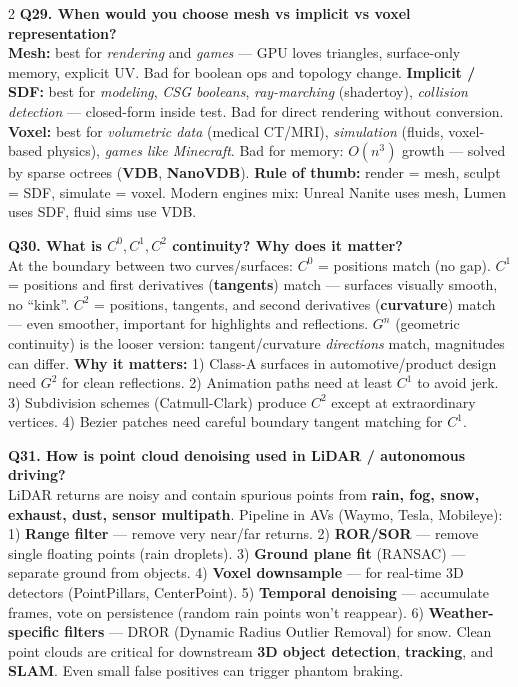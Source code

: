 \begin{paracol}{2}
\textbf{Q29. When would you choose mesh vs implicit vs voxel representation?}\\
\textbf{Mesh:} best for \textit{rendering} and \textit{games} — GPU loves triangles, surface-only memory, explicit UV. Bad for boolean ops and topology change. \textbf{Implicit / SDF:} best for \textit{modeling}, \textit{CSG booleans}, \textit{ray-marching} (shadertoy), \textit{collision detection} — closed-form inside test. Bad for direct rendering without conversion. \textbf{Voxel:} best for \textit{volumetric data} (medical CT/MRI), \textit{simulation} (fluids, voxel-based physics), \textit{games like Minecraft}. Bad for memory: $O(n^3)$ growth — solved by sparse octrees (\textbf{VDB}, \textbf{NanoVDB}). \textbf{Rule of thumb:} render = mesh, sculpt = SDF, simulate = voxel. Modern engines mix: Unreal Nanite uses mesh, Lumen uses SDF, fluid sims use VDB.

\textbf{Q30. What is $C^0, C^1, C^2$ continuity? Why does it matter?}\\
At the boundary between two curves/surfaces: \textbf{$C^0$} = positions match (no gap). \textbf{$C^1$} = positions and first derivatives (\textbf{tangents}) match — surfaces visually smooth, no ``kink''. \textbf{$C^2$} = positions, tangents, and second derivatives (\textbf{curvature}) match — even smoother, important for highlights and reflections. \textbf{$G^n$} (geometric continuity) is the looser version: tangent/curvature \textit{directions} match, magnitudes can differ. \textbf{Why it matters:} 1) Class-A surfaces in automotive/product design need $G^2$ for clean reflections. 2) Animation paths need at least $C^1$ to avoid jerk. 3) Subdivision schemes (Catmull-Clark) produce $C^2$ except at extraordinary vertices. 4) Bezier patches need careful boundary tangent matching for $C^1$.

\textbf{Q31. How is point cloud denoising used in LiDAR / autonomous driving?}\\
LiDAR returns are noisy and contain spurious points from \textbf{rain, fog, snow, exhaust, dust, sensor multipath}. Pipeline in AVs (Waymo, Tesla, Mobileye): 1) \textbf{Range filter} — remove very near/far returns. 2) \textbf{ROR/SOR} — remove single floating points (rain droplets). 3) \textbf{Ground plane fit} (RANSAC) — separate ground from objects. 4) \textbf{Voxel downsample} — for real-time 3D detectors (PointPillars, CenterPoint). 5) \textbf{Temporal denoising} — accumulate frames, vote on persistence (random rain points won't reappear). 6) \textbf{Weather-specific filters} — DROR (Dynamic Radius Outlier Removal) for snow. Clean point clouds are critical for downstream \textbf{3D object detection}, \textbf{tracking}, and \textbf{SLAM}. Even small false positives can trigger phantom braking.


\end{paracol}
